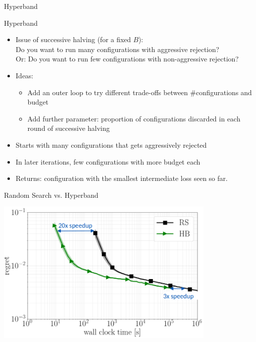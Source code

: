 {
\begin{frame}[c,fragile]{Hyperband }

\begin{block}{Hyperband}
\begin{itemize}
  \item Issue of successive halving (for a fixed $B$):\\
  		Do you want to run many configurations with aggressive rejection?\\
  		Or: Do you want to run few configurations with non-aggressive rejection? 
  \pause
  \item Ideas: 
  \begin{itemize}
    \item Add an outer loop to try different trade-offs between $\#$configurations and budget
    \item Add further parameter: proportion of configurations discarded in each round of successive halving
  \end{itemize}
  \pause
  \item Starts with many configurations that gets aggressively rejected
  \pause
  \item In later iterations, few configurations with more budget each
  \pause
  \item Returns: configuration with the smallest intermediate loss seen so far.
\end{itemize}
\end{block}

\end{frame}
}
\begin{frame}[c,fragile]{Random Search vs. Hyperband}

\centering
\includegraphics[width=0.8\textwidth]{images/randomsearch_hyperband}

\end{frame}
